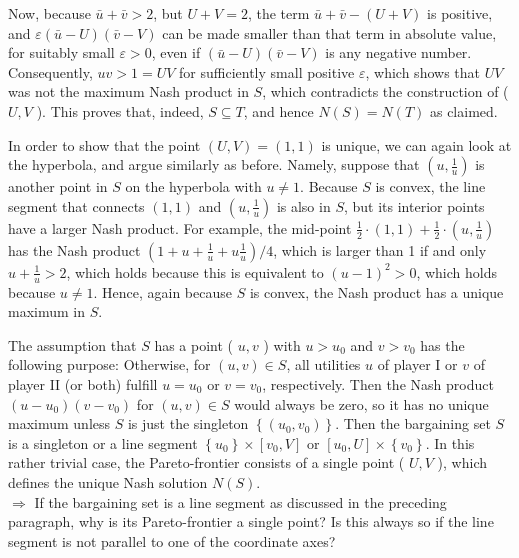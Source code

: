 \documentclass[12pt]{article}
\begin{document}
Now, because $\bar{u}+\bar{v}>2$, but $U+V=2$, the term $\bar{u}+\bar{v}-(U+V)$ is positive, and $\varepsilon(\bar{u}-U)(\bar{v}-V)$ can be made smaller than that term in absolute value, for suitably small $\varepsilon>0$, even if $(\bar{u}-U)(\bar{v}-V)$ is any negative number. Consequently, $u v>1=U V$ for sufficiently small positive $\varepsilon$, which shows that $U V$ was not the maximum Nash product in $S$, which contradicts the construction of ( $U, V$ ). This proves that, indeed, $S \subseteq T$, and hence $N(S)=N(T)$ as claimed.

In order to show that the point $(U, V)=(1,1)$ is unique, we can again look at the hyperbola, and argue similarly as before. Namely, suppose that $\left(u, \frac{1}{u}\right)$ is another point in $S$ on the hyperbola with $u \neq 1$. Because $S$ is convex, the line segment that connects $(1,1)$ and $\left(u, \frac{1}{u}\right)$ is also in $S$, but its interior points have a larger Nash product. For example, the mid-point $\frac{1}{2} \cdot(1,1)+\frac{1}{2} \cdot\left(u, \frac{1}{u}\right)$ has the Nash product $\left(1+u+\frac{1}{u}+u \frac{1}{u}\right) / 4$, which is larger than 1 if and only $u+\frac{1}{u}>2$, which holds because this is equivalent to $(u-1)^{2}>0$, which holds because $u \neq 1$. Hence, again because $S$ is convex, the Nash product has a unique maximum in $S$.

The assumption that $S$ has a point ( $u, v$ ) with $u>u_{0}$ and $v>v_{0}$ has the following purpose: Otherwise, for $(u, v) \in S$, all utilities $u$ of player I or $v$ of player II (or both) fulfill $u=u_{0}$ or $v=v_{0}$, respectively. Then the Nash product $\left(u-u_{0}\right)\left(v-v_{0}\right)$ for $(u, v) \in S$ would always be zero, so it has no unique maximum unless $S$ is just the singleton $\left\{\left(u_{0}, v_{0}\right)\right\}$. Then the bargaining set $S$ is a singleton or a line segment $\left\{u_{0}\right\} \times\left[v_{0}, V\right]$ or $\left[u_{0}, U\right] \times\left\{v_{0}\right\}$. In this rather trivial case, the Pareto-frontier consists of a single point ( $U, V$ ), which defines the unique Nash solution $N(S)$.\\
$\Rightarrow$ If the bargaining set is a line segment as discussed in the preceding paragraph, why is its Pareto-frontier a single point? Is this always so if the line segment is not parallel to one of the coordinate axes?
\end{document}
